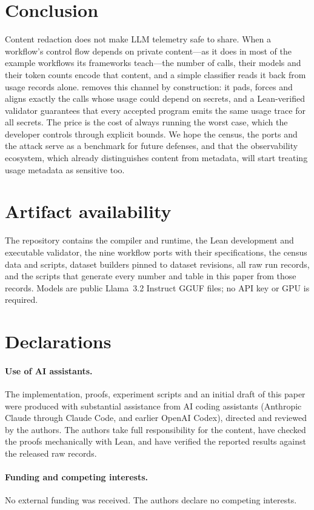 \section{Conclusion}\label{sec:conclusion}

Content redaction does not make LLM telemetry safe to share. When a workflow's control flow depends on private content---as it does in most of the example workflows its frameworks teach---the number of calls, their models and their token counts encode that content, and a simple classifier reads it back from usage records alone. \sys removes this channel by construction: it pads, forces and aligns exactly the calls whose usage could depend on secrets, and a Lean-verified validator guarantees that every accepted program emits the same usage trace for all secrets. The price is the cost of always running the worst case, which the developer controls through explicit bounds. We hope the census, the ports and the attack serve as a benchmark for future defenses, and that the observability ecosystem, which already distinguishes content from metadata, will start treating usage metadata as sensitive too.

\section*{Artifact availability}\label{sec:artifact}
The repository contains the \sys compiler and runtime, the Lean development and executable validator, the nine workflow ports with their specifications, the census data and scripts, dataset builders pinned to dataset revisions, all raw run records, and the scripts that generate every number and table in this paper from those records. Models are public Llama~3.2 Instruct GGUF files; no API key or GPU is required.

\section*{Declarations}
\paragraph{Use of AI assistants.} The implementation, proofs, experiment scripts and an initial draft of this paper were produced with substantial assistance from AI coding assistants (Anthropic Claude through Claude Code, and earlier OpenAI Codex), directed and reviewed by the authors. The authors take full responsibility for the content, have checked the proofs mechanically with Lean, and have verified the reported results against the released raw records.
\paragraph{Funding and competing interests.} No external funding was received. The authors declare no competing interests.
